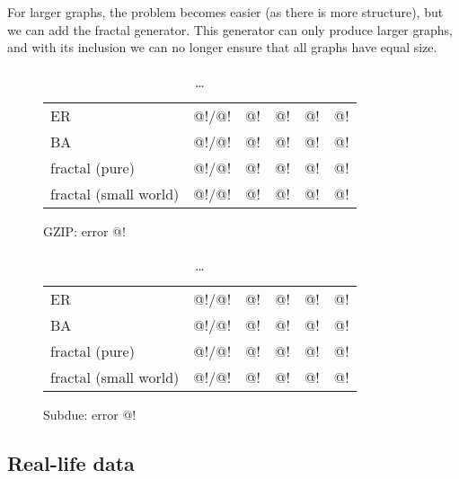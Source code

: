 \documentclass[10pt,a4paper,oneside]{article}
\begin{document}
For larger graphs, the problem becomes easier (as there is more structure), but we can add the fractal generator. This generator can only produce larger graphs, and with its inclusion we can no longer ensure that all graphs have equal size. 
\begin{table}[h]
\label{table:synthetic-large}
\begin{subfigure}[b]{1\columnwidth}
\begin{tabular}{l | r | r r r r}
\hline
  ER      & @!/@!  & @! & @! & @! & @! \\
  BA      & @!/@!  & @! & @! & @! & @!\\
  fractal (pure) & @!/@!  & @! & @! & @! & @!\\
  fractal (small world) & @!/@!  & @! & @! & @! & @!\\
\hline
\end{tabular}
\caption{GZIP: error @!}
\end{subfigure}
\begin{subfigure}[b]{1\columnwidth}
\begin{tabular}{l | r | r r r r}
\hline
  ER      & @!/@!  & @! & @! & @! & @! \\
  BA      & @!/@!  & @! & @! & @! & @!\\
  fractal (pure) & @!/@!  & @! & @! & @! & @!\\
  fractal (small world)& @!/@! & @! & @! & @! & @!\\
\hline
\end{tabular}
\caption{Subdue: error @!}
\end{subfigure}
\caption{\ldots}
\end{table}

\subsection*{Real-life data}
\end{document}

